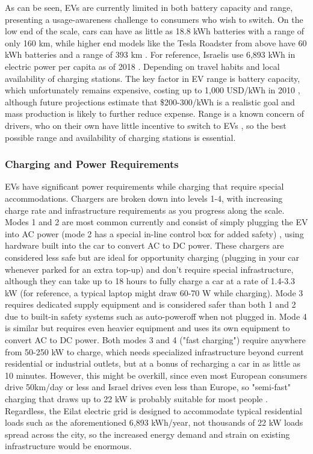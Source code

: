 \documentclass{article}                         %
\begin{document}
As can be seen, EVs are currently limited in both battery capacity and range, presenting a usage-awareness challenge to consumers who wish to switch. On the low end of the scale, cars can have as little as 18.8 kWh batteries with a range of only 160 km, while higher end models like the Tesla Roadster from above have 60 kWh batteries and a range of 393 km \cite{20182018Information}. For reference, Israelis use 6,893 kWh in electric power per capita as of 2018 \cite{2018Key2018}. Depending on travel habits and local availability of charging stations. The key factor in EV range is battery capacity, which unfortunately remains expensive, costing up to 1,000 USD/kWh in 2010 \cite{Mock2010MarketVehicles}, although future projections estimate that \$200-300/kWh is a realistic goal and mass production is likely to further reduce expense. Range is a known concern of drivers, who on their own have little incentive to switch to EVs \cite{Mock2010MarketVehicles}, so the best possible range and availability of charging stations is essential.

\subsubsection{Charging and Power Requirements}
EVs have significant power requirements while charging that require special accommodations. Chargers are broken down into levels 1-4, with increasing charge rate and infrastructure requirements as you progress along the scale. Modes 1 and 2 are most common currently and consist of simply plugging the EV into AC power (mode 2 has a special in-line control box for added safety) \cite{Bossche2010ElectricInfrastructure}, using hardware built into the car to convert AC to DC power. These chargers are considered less safe but are ideal for opportunity charging (plugging in your car whenever parked for an extra top-up) and don't require special infrastructure, although they can take up to 18 hours to fully charge a car at a rate of 1.4-3.3 kW \cite{Ustun2015ImpactSystems} (for reference, a typical laptop might draw 60-70 W while charging). Mode 3 requires dedicated supply equipment and is considered safer than both 1 and 2 due to built-in safety systems such as auto-poweroff when not plugged in. Mode 4 is similar but requires even heavier equipment and uses its own equipment to convert AC to DC power. Both modes 3 and 4 ("fast charging") require anywhere from 50-250 kW \cite{Ustun2015ImpactSystems, Bossche2010ElectricInfrastructure} to charge, which needs specialized infrastructure beyond current residential or industrial outlets, but at a bonus of recharging a car in as little as 10 minutes. However, this might be overkill, since even most European consumers drive 50km/day or less and Israel drives even less than Europe, so "semi-fast" charging that draws up to 22 kW is probably suitable for most people \cite{Bossche2010ElectricInfrastructure}. Regardless, the Eilat electric grid is designed to accommodate typical residential loads such as the aforementioned 6,893 kWh/year, not thousands of 22 kW loads spread across the city, so the increased energy demand and strain on existing infrastructure would be enormous.
\end{document}
